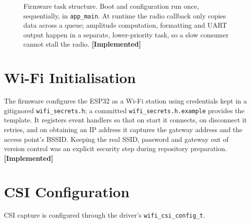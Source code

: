\documentclass[11pt,a4paper,oneside]{report}
\newcommand{\evidencetag}[2]{{\small\sffamily\bfseries\textcolor{#1}{[#2]}}}
\newcommand{\Impl}{\evidencetag{good}{Implemented}}
\newcommand{\code}[1]{\texttt{\small #1}}
\begin{document}
\begin{figure}[H]
\caption[Firmware task structure]{Firmware task structure. Boot and
configuration run once, sequentially, in \code{app\_main}. At runtime the
radio callback only copies data across a queue; amplitude computation,
formatting and UART output happen in a separate, lower-priority task, so a
slow consumer cannot stall the radio. \Impl}
\label{fig:fw}
\end{figure}

\section{Wi-Fi Initialisation}

The firmware configures the ESP32 as a Wi-Fi station using credentials kept in
a gitignored \code{wifi\_secrets.h}; a committed \code{wifi\_secrets.h.example}
provides the template. It registers event handlers so that on start it
connects, on disconnect it retries, and on obtaining an IP address it captures
the gateway address and the access point's BSSID. Keeping the real SSID,
password and gateway out of version control was an explicit security step
during repository preparation. \Impl

\section{CSI Configuration}

CSI capture is configured through the driver's \code{wifi\_csi\_config\_t}.
\end{document}
